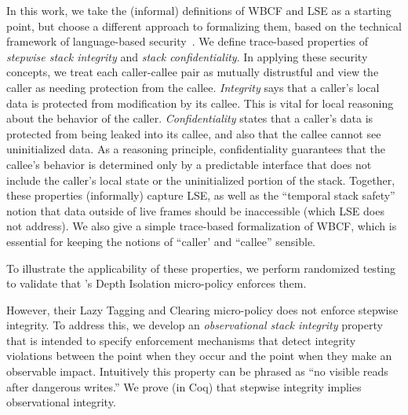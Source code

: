 \documentclass[acmsmall,review,anonymous]{acmart}\settopmatter{printfolios=true,printccs=false,printacmref=false}
\begin{document}
In this work, we take the (informal) definitions of WBCF and LSE as a starting point,
but choose a different approach to formalizing them, based on the
technical framework of language-based security~\citep{??}.  We define
trace-based properties of \emph{stepwise stack integrity} and \emph{stack confidentiality}.
In applying these security concepts, we treat each caller-callee pair as mutually distrustful
and view the caller as needing protection from the callee. 
{\em Integrity} says that a caller's local data is protected from modification by its callee.
This is vital for local reasoning about the behavior of the caller.
{\em Confidentiality} states that a caller's data is protected
from being leaked into its callee, and also that the callee cannot see uninitialized data.
As a reasoning principle, confidentiality guarantees that the callee's
behavior is determined only by a predictable interface that does not include the caller's
local state or the uninitialized portion of the stack.
Together, these properties (informally) capture LSE, as well as the ``temporal stack safety''
notion that data outside of live frames should be inaccessible (which LSE does not address).
We also give a simple trace-based formalization of WBCF, which is essential for keeping the
notions of ``caller' and ``callee'' sensible.

To illustrate the applicability of these properties, we perform randomized testing to
validate that \citeauthor{DBLP:conf/sp/RoesslerD18}'s Depth Isolation micro-policy enforces them.

However, their Lazy Tagging and Clearing micro-policy does not enforce stepwise integrity.
To address this, we develop an \emph{observational stack integrity} property that
is intended to specify enforcement mechanisms that
detect integrity violations between the point when they occur and the point when they make
an observable impact. Intuitively this property can be phrased as ``no visible reads after dangerous
writes.''  We prove (in Coq) that stepwise integrity implies observational integrity.
\end{document}

